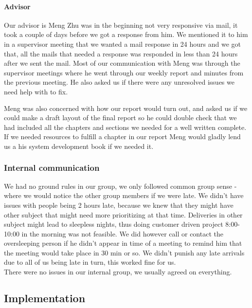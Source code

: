 \paragraph{Advisor}
Our advisor is Meng Zhu was in the beginning not very responsive via mail, it took a couple of days before we got a response from him. We mentioned it to him in a supervisor meeting that we wanted a mail response in 24 hours and we got that, all the mails that needed a response was responded in less than 24 hours after we sent the mail. Most of our communication with Meng was through the supervisor meetings where he went through our weekly report and minutes from the previous meeting. He also asked us if there were any unresolved issues we need help with to fix. 

Meng was also concerned with how our report would turn out, and asked us if we could make a draft layout of the final report so he could double check that we had included all the chapters and sections we needed for a well written complete. If we needed resources to fulfill a chapter in our report Meng would gladly lend us a his system development book if we needed it. 

\subsubsection{Internal communication}
We had no ground rules in our group, we only followed common group sense - where we would notice the other group members if we were late. We didn't have issues with people being 2 hours late, because we knew that they might have other subject that might need more prioritizing at that time. Deliveries in other subject might lead to sleepless nights, thus doing customer driven project 8:00-10:00 in the morning was not feasible. We did however call or contact the oversleeping person if he didn't appear in time of a meeting to remind him that the meeting would take place in 30 min or so.
We didn't punish any late arrivals due to all of us being late in turn, this worked fine for us.\\
There were no issues in our internal group, we usually agreed on everything.

\subsection{Implementation}
